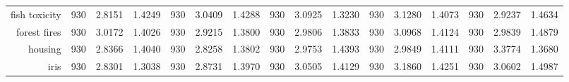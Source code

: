\begin{table}[H]
{\begin{tabular}{rccccccccccccccc}
			fish toxicity                       & 930                                     & \cellcolor[rgb]{ .776,  .937,  .808}\textcolor[rgb]{ 0,  .38,  0}{2.8151}          & 1.4249          & 930                             & 3.0409                                                                    & 1.4288          & 930                             & 3.0925          & 1.3230          & 930                             & 3.1280                                                                    & 1.4073          & 930                             & 2.9237                                                                    & 1.4634          \\
			forest fires                        & 930                                     & 3.0172                                                                             & 1.4026          & 930                             & \cellcolor[rgb]{ .776,  .937,  .808}\textcolor[rgb]{ 0,  .38,  0}{2.9215} & 1.3800          & 930                             & 2.9806          & 1.3833          & 930                             & 3.0968                                                                    & 1.4124          & 930                             & 2.9839                                                                    & 1.4879          \\
			housing                             & 930                                     & 2.8366                                                                             & 1.4040          & 930                             & \cellcolor[rgb]{ .776,  .937,  .808}\textcolor[rgb]{ 0,  .38,  0}{2.8258} & 1.3802          & 930                             & 2.9753          & 1.4393          & 930                             & 2.9849                                                                    & 1.4111          & 930                             & 3.3774                                                                    & 1.3680          \\
			iris                                & 930                                     & \cellcolor[rgb]{ .776,  .937,  .808}\textcolor[rgb]{ 0,  .38,  0}{2.8301}          & 1.3038          & 930                             & 2.8731                                                                    & 1.3970          & 930                             & 3.0505          & 1.4129          & 930                             & 3.1860                                                                    & 1.4251          & 930                             & 3.0602                                                                    & 1.4987          \\

\end{tabular}}
\end{table}
